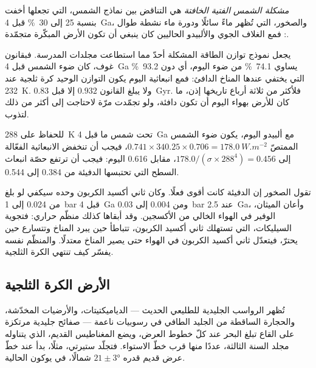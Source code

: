 \begin{definition}\label{def:b2:precambrian-earth:faint-sun}
\emph{مشكلة الشمس الفتية الخافتة} هي التناقض بين
نماذج الشمس، التي تجعلها أخفت بنسبة 25 إلى \qty{30}{\percent} قبل \qty{4}{Ga}،
والصخور، التي تُظهر ماءً سائلًا ودورة ماء نشطة طوال : فمع الغلاف الجوي والألبيدو
الحاليين كان ينبغي أن تكون الأرض المبكّرة متجمّدة.
\end{definition}

يجعل نموذج توازن الطاقة المشكلة أحدّ مما استطاعت مجلدات المدرسة. فبقانون غوف،
كان ضوء الشمس قبل \qty{4}{Ga} يساوي \qty{74.1}{\percent} من ضوء اليوم، أي دون
\qty{93.2}{\percent} التي يختفي عندها المناخ الدافئ: فمع انبعاثية اليوم يكون التوازن
الوحيد كرة ثلجية عند \qty{232}{K}. ولا يبلغ القانون $0.932$ إلا
قبل \qty{0.83}{Gyr}. فلأكثر من ثلاثة أرباع تاريخها إذن، ما كان للأرض بهواء
اليوم أن تكون دافئة، ولو تجمّدت مرّة لاحتاجت إلى أكثر من ذلك لتذوب.

\begin{example}\label{ex:b2:precambrian-earth:young-greenhouse}
للحفاظ على \qty{288}{K} تحت شمس ما قبل \qty{4}{Ga} مع ألبيدو اليوم، يكون ضوء الشمس
الممتصّ $0.741\times340.25\times0.706 = \qty{178.0}{W.m^{-2}}$، فيجب أن تنخفض الانبعاثية الفعّالة
إلى $178.0/(\sigma\times288^4) = 0.456$، مقابل 0.616 اليوم: فيجب أن ترتفع حصّة
انبعاث السطح التي تحتبسها الدفيئة من 0.384 إلى 0.544.
\end{example}

تقول الصخور إن الدفيئة كانت أقوى فعلًا. وكان ثاني أكسيد الكربون وحده سيكفي لو بلغ
من 0.024 إلى \qty{1}{bar} قبل \qty{4}{Ga} ومن 0.004 إلى \qty{0.03}{bar} عند \qty{2.5}{Ga}،
وأعان الميثان، الوفير في الهواء الخالي من الأكسجين. وقد أبقاها كذلك منظّم حراري: فتجوية السيليكات،
التي تستهلك ثاني أكسيد الكربون، تتباطأ حين يبرد المناخ وتتسارع حين يحترّ، فيتعدّل
ثاني أكسيد الكربون في الهواء حتى يصير المناخ معتدلًا. والمنظّم نفسه يفسّر
كيف تنتهي الكرة الثلجية.

\subsection*{الأرض الكرة الثلجية}

تُظهر الرواسب الجليدية للطليعي الحديث --- الدياميكتيتات، والأرضيات المخدّشة، والحجارة الساقطة من
الجليد الطافي في رسوبيات ناعمة --- صفائح جليدية مرتكزة على القاع تبلغ البحر عند كلّ خطوط العرض،
ويضع المغناطيس القديم، الذي يتناوله مجلد السنة الثالثة، عددًا منها قرب خطّ الاستواء. فتجلّد ستيرتي، مثلًا،
بدأ عند خطّ عرض قديم قدره $21 \pm \ang{3}$ شمالًا، في يوكون الحالية.

